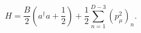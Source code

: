 \begin{equation}
   H=\frac{B}{2}\left( a^\dag a +\frac{1}{2}\right)
   +\frac{1}2\sum_{n=1}^{D-3}(p_\mu^2)_n.
   \label{23}
   \end{equation}

